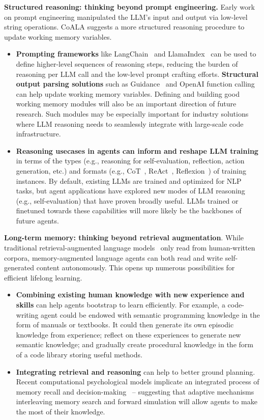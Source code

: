 \documentclass[10pt]{article} %
\begin{document}
\textbf{Structured reasoning: thinking beyond prompt engineering.} Early work on prompt engineering manipulated the LLM's input and output via low-level string operations. CoALA suggests a more structured reasoning procedure to update working memory variables.
\begin{itemize}
\item \textbf{Prompting frameworks} like LangChain~\citep{langchain} and LlamaIndex~\citep{LlamaIndex} can be used to define higher-level sequences of reasoning steps, reducing the burden of reasoning per LLM call and the low-level prompt crafting efforts. \textbf{Structural output parsing solutions} such as Guidance~\citep{Guidance} and OpenAI function calling~\citep{functioncalls} can help update working memory variables. Defining and building good working memory modules will also be an important direction of future research. Such modules may be especially important for industry solutions where LLM reasoning needs to seamlessly integrate with large-scale code infrastructure. 


\item \textbf{Reasoning usecases in agents can inform and reshape LLM training} in terms of the types (e.g., reasoning for self-evaluation, reflection, action generation, etc.) and formats (e.g., CoT~\citep{wei2022chain}, ReAct~\citep{yao2022react}, Reflexion~\citep{shinn2023reflexion}) of training instances. By default, existing LLMs are trained and optimized for NLP tasks, but agent applications have explored new modes of LLM reasoning (e.g., self-evaluation) that have proven broadly useful. LLMs trained or finetuned towards these capabilities will more likely be the backbones of future agents.  
\end{itemize}

\textbf{Long-term memory: thinking beyond retrieval augmentation}. While traditional retrieval-augmented language models~\citep{guu2020retrieval, lewis2020retrieval, borgeaud2022improving} only read from human-written corpora, memory-augmented language agents can both read and write self-generated content autonomously. This opens up numerous possibilities for efficient lifelong learning.
\begin{itemize}
    \item \textbf{Combining existing human knowledge with new experience and skills} can help agents bootstrap to learn efficiently. For example, a code-writing agent could be endowed with semantic programming knowledge in the form of manuals or textbooks. It could then generate its own episodic knowledge from experience; reflect on these experiences to generate new semantic knowledge; and gradually create procedural knowledge in the form of a code library storing useful methods. 
    \item \textbf{Integrating retrieval and reasoning} can help to better ground planning. Recent computational psychological models implicate an integrated process of memory recall and decision-making~\citep{zhou2023episodic, zhao2022process} -- suggesting that adaptive mechanisms interleaving memory search and forward simulation will allow agents to make the most of their knowledge.
\end{itemize} 
\end{document}
